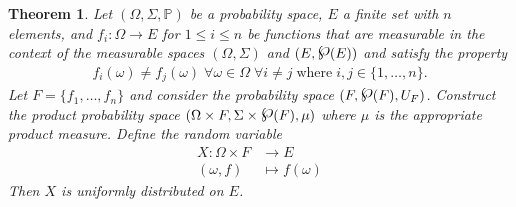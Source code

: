 \documentclass{article}
\newcommand{\powerset}{\raisebox{.15\baselineskip}{\Large\ensuremath{\wp}}}
\newtheorem{theorem}{Theorem}
\theoremstyle{remark}
\renewcommand{\P}{\mathbb{P}}
\begin{document}
\begin{theorem}\label{thm:unif}
	Let $(\Omega, \Sigma, \P)$ be a probability space, $E$ a finite set with
	$n$ elements, and $f_i: \Omega \to E$ for $1 \le i \le n$ be functions that
	are measurable in the context of the measurable spaces $(\Omega, \Sigma)$
	and $(E, \powerset(E))$ and satisfy the property
	\begin{align*}
		f_i(\omega) \ne f_j(\omega)
		\; \forall \omega \in \Omega
		\; \forall i \ne j\;\text{where}\;i, j \in \{1, \ldots, n\}.
	\end{align*}
	Let $F = \{f_1, \ldots, f_n\}$ and consider the probability space $(F,
	\powerset(F), U_F)$. Construct the product probability space $(\Omega
	\times F, \Sigma \times \powerset(F), \mu)$ where $\mu$ is the appropriate
	product measure. Define the random variable
	\begin{align*}
		X: \Omega \times F &\to E\\
		(\omega, f) &\mapsto f(\omega)
	\end{align*}
	Then $X$ is uniformly distributed on $E$.
\end{theorem}
\end{document}
